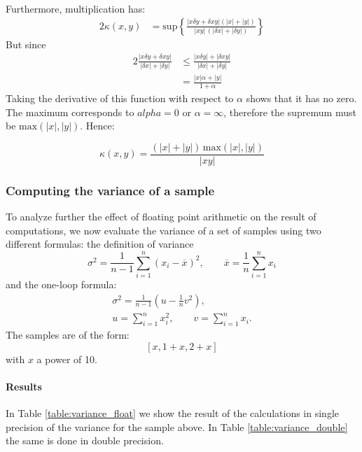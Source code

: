\documentclass[a4paper,11]{article}
\begin{document}
Furthermore, multiplication has:
\begin{alignat*}{2}
	\kappa(x,y) & = \mathrm{sup}\left\{ \frac{|x\delta y+\delta x y|
			(|x|+|y|)}{|xy|\,(|\delta x|+|\delta y|)}\right\}
\end{alignat*}
But since 
\begin{alignat*}{2}
	\frac{|x\delta y+\delta x y|}{|\delta x|+|\delta y|} & \leq
		\frac{|x\delta y| +|\delta x y|}{|\delta x|+|\delta y|} \\
		&= \frac{|x|\alpha +|y|}{1+\alpha}
\end{alignat*}
Taking the derivative of this function with respect to $\alpha$ shows that it 
has no zero. The maximum corresponds to $alpha = 0$ or $\alpha=\infty$, 
therefore the supremum must be $\mathrm{max}(|x|,|y|)$.
Hence:

\[
	\kappa(x,y) = \frac{(|x|+|y|)\,\mathrm{max}(|x|,|y|)}{|xy|}
\]


\subsubsection{Computing the variance of a sample}

To analyze further the effect of floating point arithmetic on the result of 
computations, we now evaluate the variance of a set of samples using 
two different formulas: the definition of variance
\begin{equation}\label{eq:samplevar}
      \sigma^2 = \frac{1}{n-1} \sum_{i=1}^n (x_i - \overline{x})^2,
      \qquad 
      \overline{x} = \frac{1}{n} \sum_{i=1}^n x_i
\end{equation}
and the one-loop formula:
\begin{equation}\label{eq:one_loop_var}
   \begin{split}
      \sigma^2 = \frac{1}{n-1} \left( u - \tfrac{1}{n}v^2 \right),\\
      u  = \sum_{i=1}^n x_i^2, 
      \qquad
      v = \sum_{i=1}^n x_i.
   \end{split}
\end{equation}
The samples are of the form:
\[
	[x, 1+x, 2+x]
\]
with $x$ a power of 10.

\paragraph{Results}

In Table \ref{table:variance_float} we show the result of the calculations 
in single precision
of the variance for the sample above. In Table \ref{table:variance_double} the 
same is done in double precision.
\end{document}
